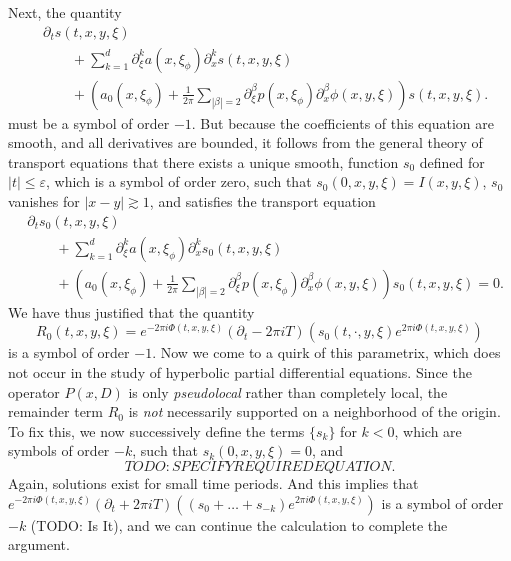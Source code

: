 Next, the quantity
%
\begin{align*}
    &\partial_t s(t,x,y,\xi)\\
    &\quad\quad + \sum_{k = 1}^d \partial_\xi^k a(x,\xi_\phi) \partial_x^k s(t,x,y,\xi)\\
    &\quad\quad + \left( a_0(x,\xi_\phi) + \frac{1}{2 \pi} \sum_{|\beta| = 2} \partial_\xi^\beta p(x,\xi_\phi) \partial_x^\beta \phi(x,y,\xi) \right) s(t,x,y,\xi).
\end{align*}
%
must be a symbol of order $-1$. But because the coefficients of this equation are smooth, and all derivatives are bounded, it follows from the general theory of transport equations that there exists a unique smooth, function $s_0$ defined for $|t| \leq \varepsilon$, which is a symbol of order zero, such that $s_0(0,x,y,\xi) = I(x,y,\xi)$, $s_0$ vanishes for $|x - y| \gtrsim 1$, and satisfies the transport equation
%
\begin{align*}
    &\partial_t s_0(t,x,y,\xi)\\
    &\quad\quad + \sum_{k = 1}^d \partial_\xi^k a(x,\xi_\phi) \partial_x^k s_0(t,x,y,\xi)\\
    &\quad\quad + \left( a_0(x,\xi_\phi) + \frac{1}{2 \pi} \sum_{|\beta| = 2} \partial_\xi^\beta p(x,\xi_\phi) \partial_x^\beta \phi(x,y,\xi) \right) s_0(t,x,y,\xi) = 0.
\end{align*}
%
We have thus justified that the quantity
%
\[ R_0(t,x,y,\xi) = e^{-2 \pi i \Phi(t,x,y,\xi)} (\partial_t - 2 \pi i T)(s_0(t,\cdot,y,\xi) e^{2 \pi i \Phi(t,x,y,\xi)}) \]
%
is a symbol of order $-1$. Now we come to a quirk of this parametrix, which does not occur in the study of hyperbolic partial differential equations. Since the operator $P(x,D)$ is only \emph{pseudolocal} rather than completely local, the remainder term $R_0$ is \emph{not} necessarily supported on a neighborhood of the origin. To fix this, we now successively define the terms $\{ s_k \}$ for $k < 0$, which are symbols of order $-k$, such that $s_k(0,x,y,\xi) = 0$, and
%
\[ TODO: SPECIFY REQUIRED EQUATION. \]
%
Again, solutions exist for small time periods. And this implies that $e^{-2 \pi i \Phi(t,x,y,\xi)} (\partial_t + 2 \pi i T)((s_0 + \dots + s_{-k}) e^{2 \pi i \Phi(t,x,y,\xi)})$ is a symbol of order $-k$ (TODO: Is It), and we can continue the calculation to complete the argument.


